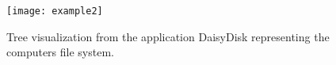 \begin{figure}[b]
  \texttt{[image: example2]}
  \caption[Visualization example two]{Tree visualization from the application DaisyDisk representing the computers file system.}
  \label{fig:example2}
  \centering
\end{figure}